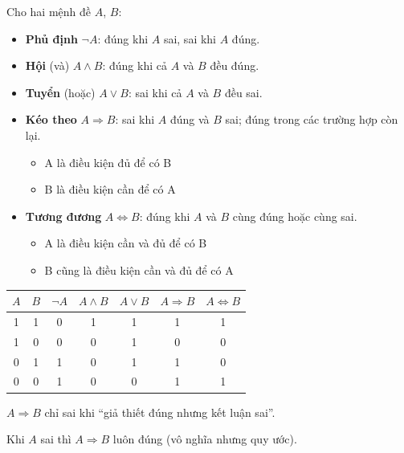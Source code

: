 \documentclass[12pt,a4paper]{article}
\begin{document}
\begin{dinhnghia}
  Cho hai mệnh đề $A$, $B$:
  \begin{itemize}
    \item \textbf{Phủ định} $\neg A$: đúng khi $A$ sai, sai khi $A$ đúng.
    \item \textbf{Hội} (và) $A \wedge B$: đúng khi cả $A$ và $B$ đều đúng.
    \item \textbf{Tuyển} (hoặc) $A \vee B$: sai khi cả $A$ và $B$ đều sai.
    \item \textbf{Kéo theo} $A \Rightarrow B$: sai khi $A$ đúng và $B$ sai; đúng trong các trường hợp còn lại.
    \begin{itemize}
        \item A là điều kiện đủ để có B
        \item B là điều kiện cần để có A
    \end{itemize}
    \item \textbf{Tương đương} $A \Leftrightarrow B$: đúng khi $A$ và $B$ cùng đúng hoặc cùng sai.
    \begin{itemize}
        \item A là điều kiện cần và đủ để có B
        \item B cũng là điều kiện cần và đủ để có A
    \end{itemize}
  \end{itemize}
\end{dinhnghia}

\begin{congthuc}[title={Bảng chân lý}]
  \begin{center}
  \renewcommand{\arraystretch}{1.3}
  \begin{tabular}{|c|c||c|c|c|c|c|}
  \hline
  $A$ & $B$ & $\neg A$ & $A \wedge B$ & $A \vee B$ & $A \Rightarrow B$ & $A \Leftrightarrow B$ \\
  \hline
  1 & 1 & 0 & 1 & 1 & 1 & 1 \\
  1 & 0 & 0 & 0 & 1 & 0 & 0 \\
  0 & 1 & 1 & 0 & 1 & 1 & 0 \\
  0 & 0 & 1 & 0 & 0 & 1 & 1 \\
  \hline
  \end{tabular}
  \end{center}
\end{congthuc}

\begin{luuy}
  $A \Rightarrow B$ chỉ sai khi ``giả thiết đúng nhưng kết luận sai''. 
  
  Khi $A$ sai thì $A \Rightarrow B$ luôn đúng (vô nghĩa nhưng quy ước).
\end{luuy}
\end{document}
